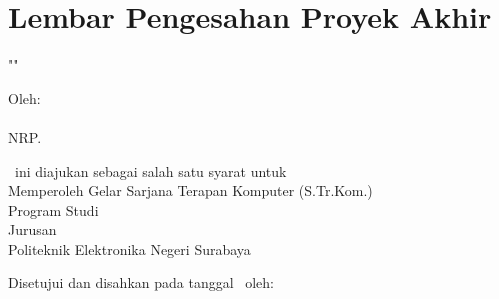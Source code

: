 %
%
%


\chapter*{Lembar Pengesahan Proyek Akhir}



{
  \centering
  "\MakeUppercase{\judul}"
}

\vspace*{10pt}

{
  \centering
  Oleh: \\
  \bo{\underline{\penulis}} \\
  NRP. \nrp \\
}

\vspace*{25pt}

{
  \centering
  \type \ ini diajukan sebagai salah satu syarat untuk \\
  Memperoleh Gelar Sarjana Terapan Komputer (S.Tr.Kom.) \\
  Program Studi \jenjang\ \prodi \\
  Jurusan \jurusan \\
  Politeknik Elektronika Negeri Surabaya \\
}

\vspace*{5pt}

{
  \centering
  Disetujui dan disahkan pada tanggal \tanggalSiapSidang\ oleh:
}

\vspace*{5pt}

